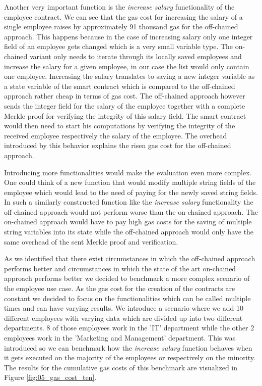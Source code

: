 Another very important function is the \textit{increase salary} functionality of the employee contract.
We can see that the gas cost for increasing the salary of a single employee raises by approximately 91 thousand gas for the off-chained approach.
This happens because in the case of increasing salary only one integer field of an employee gets changed which is a very small variable type.
The on-chained variant only needs to iterate through its locally saved employees and increase the salary for a given employee, in our case the list would only contain one employee.
Increasing the salary translates to saving a new integer variable as a state variable of the smart contract which is compared to the off-chained approach rather cheap in terms of gas cost.
The off-chained approach however sends the integer field for the salary of the employee together with a complete Merkle proof for verifying the integrity of this salary field.
The smart contract would then need to start his computations by verifying the integrity of the received employee respectively the salary of the employee.
The overhead introduced by this behavior explains the risen gas cost for the off-chained approach.

Introducing more functionalities would make the evaluation even more complex.
One could think of a new function that would modify multiple string fields of the employee which would lead to the need of paying for the newly saved string fields.
In such a similarly constructed function like the \textit{increase salary} functionality the off-chained approach would not perform worse than the on-chained approach.
The on-chained approach would have to pay high gas costs for the saving of multiple string variables into its state while the off-chained approach would only have the same overhead of the sent Merkle proof and verification.

As we identified that there exist circumstances in which the off-chained approach performs better and circumstances in which the state of the art on-chained approach performs better we decided to benchmark a more complex scenario of the employee use case.
As the gas cost for the creation of the contracts are constant we decided to focus on the functionalities which can be called multiple times and can have varying results.
We introduce a scenario where we add 10 different employees with varying data which are divided up into two different departments.
8 of those employees work in the 'IT' department while the other 2 employees work in the 'Marketing and Management' department.
This was introduced so we can benchmark how the \textit{increase salary} function behaves when it gets executed on the majority of the employees or respectively on the minority.
The results for the cumulative gas costs of this benchmark are visualized in Figure \ref{fig:05_gas_cost_ten}.

